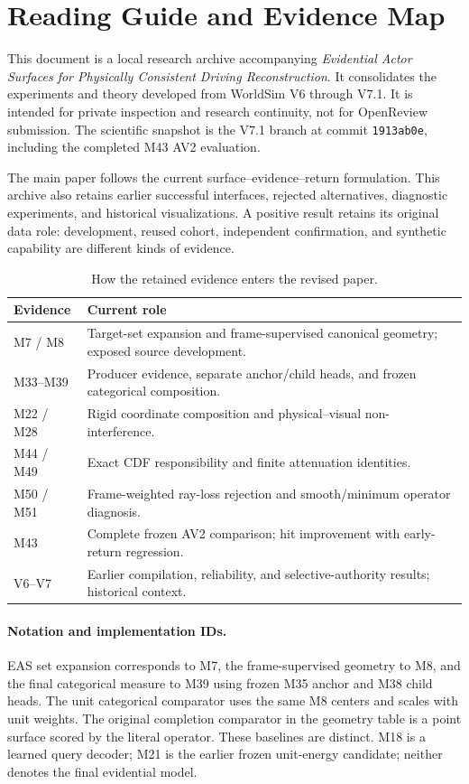 \section{Reading Guide and Evidence Map}
\label{sec:archive-guide}

This document is a local research archive accompanying \emph{Evidential Actor Surfaces for Physically Consistent
Driving Reconstruction}. It consolidates the experiments and theory developed from WorldSim V6 through V7.1.
It is intended for private inspection and research continuity, not for OpenReview submission.
The scientific snapshot is the V7.1 branch at commit \texttt{1913ab0e}, including the completed M43 AV2 evaluation.

The main paper follows the current surface--evidence--return formulation. This archive also retains earlier
successful interfaces, rejected alternatives, diagnostic experiments, and historical visualizations.
A positive result retains its original data role: development, reused cohort, independent confirmation,
and synthetic capability are different kinds of evidence.

\begin{table}[h]
\centering\small
\setlength{\tabcolsep}{4pt}
\begin{tabular}{p{.22\linewidth}p{.67\linewidth}}
\toprule
Evidence & Current role\\
\midrule
M7 / M8 & Target-set expansion and frame-supervised canonical geometry; exposed source development.\\
M33--M39 & Producer evidence, separate anchor/child heads, and frozen categorical composition.\\
M22 / M28 & Rigid coordinate composition and physical--visual non-interference.\\
M44 / M49 & Exact CDF responsibility and finite attenuation identities.\\
M50 / M51 & Frame-weighted ray-loss rejection and smooth/minimum operator diagnosis.\\
M43 & Complete frozen AV2 comparison; hit improvement with early-return regression.\\
V6--V7 & Earlier compilation, reliability, and selective-authority results; historical context.\\
\bottomrule
\end{tabular}
\caption{How the retained evidence enters the revised paper.}
\end{table}

\paragraph{Notation and implementation IDs.}
EAS set expansion corresponds to M7, the frame-supervised geometry to M8, and the final categorical
measure to M39 using frozen M35 anchor and M38 child heads.
The unit categorical comparator uses the same M8 centers and scales with unit weights.
The original completion comparator in the geometry table is a point surface scored by the literal operator.
These baselines are distinct. M18 is a learned query decoder; M21 is the earlier frozen unit-energy
candidate; neither denotes the final evidential model.

